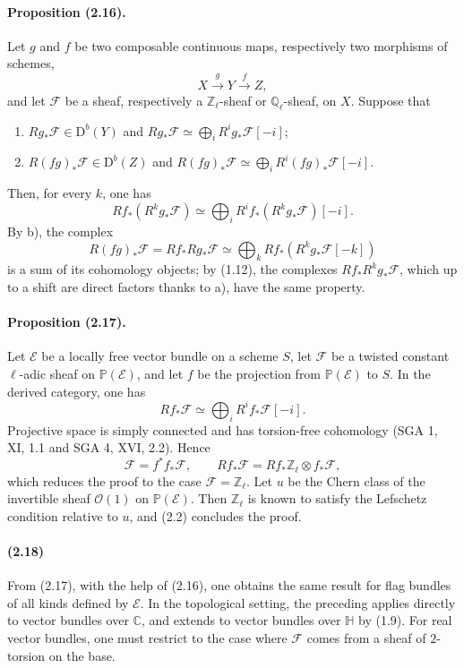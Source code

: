 \documentclass[10pt]{article}
\providecommand{\C}{\mathbb C}
\providecommand{\Ql}{\mathbb Q_\ell}
\providecommand{\Zl}{\mathbb Z_\ell}
\providecommand{\D}{\mathrm D}
\begin{document}
\paragraph{Proposition (2.16).} Let $g$ and $f$ be two composable continuous maps, respectively two morphisms of schemes,
\[
X\xrightarrow{g}Y\xrightarrow{f}Z,
\]
and let $\mathcal F$ be a sheaf, respectively a $\Zl$-sheaf or $\Ql$-sheaf, on $X$. Suppose that
\begin{enumerate}[label=\alph*)]
\item $Rg_*\mathcal F\in\D^b(Y)$ and $Rg_*\mathcal F\simeq\bigoplus_iR^ig_*\mathcal F[-i]$;
\item $R(fg)_*\mathcal F\in\D^b(Z)$ and $R(fg)_*\mathcal F\simeq\bigoplus_iR^i(fg)_*\mathcal F[-i]$.
\end{enumerate}
Then, for every $k$, one has
\[
Rf_*(R^kg_*\mathcal F)\simeq\bigoplus_i R^if_*(R^kg_*\mathcal F)[-i].
\]
By b), the complex
\[
R(fg)_*\mathcal F=Rf_*Rg_*\mathcal F\simeq
\bigoplus_kRf_*(R^kg_*\mathcal F[-k])
\]
is a sum of its cohomology objects; by (1.12), the complexes $Rf_*R^kg_*\mathcal F$, which up to a shift are direct factors thanks to a), have the same property.

\paragraph{Proposition (2.17).} Let $\mathcal E$ be a locally free vector bundle on a scheme $S$, let $\mathcal F$ be a twisted constant $\ell$-adic sheaf on $\mathbb P(\mathcal E)$, and let $f$ be the projection from $\mathbb P(\mathcal E)$ to $S$. In the derived category, one has
\[
Rf_*\mathcal F\simeq\bigoplus_iR^if_*\mathcal F[-i].
\]
Projective space is simply connected and has torsion-free cohomology (SGA 1, XI, 1.1 and SGA 4, XVI, 2.2). Hence
\[
\mathcal F=f^*f_*\mathcal F,
\qquad
Rf_*\mathcal F=Rf_*\Zl\otimes f_*\mathcal F,
\]
which reduces the proof to the case $\mathcal F=\Zl$. Let $u$ be the Chern class of the invertible sheaf $\mathcal O(1)$ on $\mathbb P(\mathcal E)$. Then $\Zl$ is known to satisfy the Lefschetz condition relative to $u$, and (2.2) concludes the proof.

\paragraph{(2.18)} From (2.17), with the help of (2.16), one obtains the same result for flag bundles of all kinds defined by $\mathcal E$. In the topological setting, the preceding applies directly to vector bundles over $\C$, and extends to vector bundles over $\mathbb H$ by (1.9). For real vector bundles, one must restrict to the case where $\mathcal F$ comes from a sheaf of $2$-torsion on the base.
\end{document}
